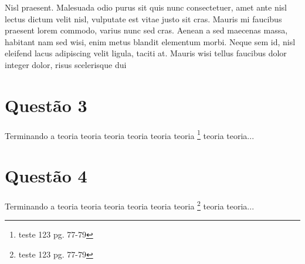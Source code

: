     Nisl praesent. Malesuada odio purus sit quis nunc consectetuer, amet ante nisl lectus dictum velit nisl, vulputate est vitae justo sit cras. Mauris mi faucibus praesent lorem commodo, varius nunc sed cras. Aenean a sed maecenas massa, habitant nam sed wisi, enim metus blandit elementum morbi. Neque sem id, nisl eleifend lacus adipiscing velit ligula, taciti at. Mauris wisi tellus faucibus dolor integer dolor, risus scelerisque dui
  
  \section{Questão 3}
  \label{sec:question3}

    Terminando a teoria teoria teoria teoria teoria teoria \citep{knuthwebsite}\footnote{teste 123 pg. 77-79} teoria teoria...

  \section{Questão 4}
  \label{sec:question4}

    Terminando a teoria teoria teoria teoria teoria teoria \citep{knuthwebsite}\footnote{teste 123 pg. 77-79} teoria teoria...


